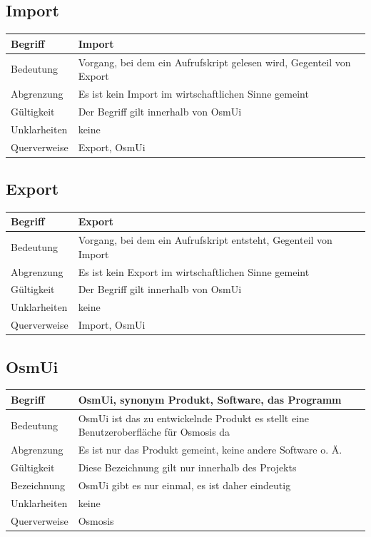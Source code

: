 \documentclass[a4paper,12pt]{scrartcl}
\begin{document}
\begin{center}
\subsection{Import}
\begin{tabular}{|p{5cm}|p{10cm}|}
\hline Begriff & \textbf{Import}\\
\hline Bedeutung & Vorgang, bei dem ein Aufrufskript gelesen wird, Gegenteil von Export \\ 
\hline Abgrenzung & Es ist kein Import im wirtschaftlichen Sinne gemeint\\ 
\hline Gültigkeit & Der Begriff gilt innerhalb von OsmUi \\ 
\hline Unklarheiten & keine \\ 
\hline Querverweise & Export, OsmUi \\ 
\hline
\end{tabular}
\subsection{Export}
\begin{tabular}{|p{5cm}|p{10cm}|}
\hline Begriff & \textbf{Export}\\
\hline Bedeutung & Vorgang, bei dem ein Aufrufskript entsteht, Gegenteil von Import \\ 
\hline Abgrenzung & Es ist kein Export im wirtschaftlichen  Sinne gemeint\\ 
\hline Gültigkeit & Der Begriff gilt innerhalb von OsmUi \\ 
\hline Unklarheiten & keine \\ 
\hline Querverweise & Import, OsmUi \\ 
\hline
\end{tabular}
\subsection{OsmUi}
\begin{tabular}{|p{5cm}|p{10cm}|}
\hline Begriff & \textbf{OsmUi}, synonym Produkt, Software, das Programm \\ 
\hline Bedeutung & OsmUi ist das zu entwickelnde Produkt es stellt eine Benutzeroberfläche für Osmosis da \\ 
\hline Abgrenzung & Es ist nur das Produkt gemeint, keine andere Software o. Ä. \\ 
\hline Gültigkeit & Diese Bezeichnung gilt nur innerhalb des Projekts \\ 
\hline Bezeichnung & OsmUi gibt es nur einmal, es ist daher eindeutig \\ 
\hline Unklarheiten & keine \\ 
\hline Querverweise & Osmosis \\ 
\hline 
\end{tabular}

\end{center}
\end{document}
